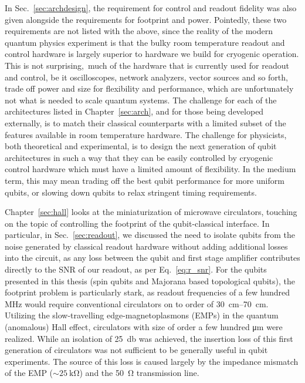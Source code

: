 In Sec.~\ref{sec:archdesign}, the requirement for control and readout fidelity was also given alongside the requirements for footprint and power. Pointedly,
these two requirements are not listed with the above, since the reality of the modern quantum physics experiment is that the bulky room temperature readout
and control hardware is largely superior to hardware we build for cryogenic operation. This is not surprising, much of the hardware that is currently used
for readout and control, be it oscilloscopes, network analyzers, vector sources and so forth, trade off power and size for flexibility and performance, which
are unfortunately not what is needed to scale quantum systems. The challenge for each of the architectures listed in Chapter~\ref{sec:arch}, and for those
being developed externally, is to match their classical counterparts with a limited subset of the features available in room temperature hardware.
The challenge for physicists, both theoretical and experimental, is to design the next generation of qubit architectures in such a way that they can be easily
controlled by cryogenic control hardware which must have a limited amount of flexibility. In the medium term, this may mean trading off the best qubit performance
for more uniform qubits, or slowing down qubits to relax stringent timing requirements.

Chapter~\ref{sec:hall} looks at the miniaturization of microwave circulators, touching on the topic of controlling the footprint of the qubit-classical
interface. In particular, in Sec.~\ref{sec:readout}, we discussed the need to isolate qubits from the noise generated by classical readout hardware without
adding additional losses into the circuit, as any loss between the qubit and first stage amplifier contributes directly to the SNR of our readout, as per
Eq.~\ref{eq:r_snr}. For the qubits presented in this thesis (spin qubits and Majorana based topological qubits), the footprint problem is particularly
stark, as readout frequencies of a few hundred \si{\mega\hertz} would require conventional circulators on to order of \SIrange{30}{70}{\centi\meter}.
Utilizing the slow-travelling edge-magnetoplasmons (EMPs) in the quantum (anomalous) Hall effect, circulators with size of order a few hundred \si{\micro\meter}
were realized. While an isolation of \SI{25}{\decibel} was achieved, the insertion loss of this first generation of circulators was not sufficient to
be generally useful in qubit experiments. The source of this loss is caused largely by the impedance mismatch of the EMP ($\sim \SI{25}{\kilo\ohm}$) and the
\SI{50}{\ohm} transmission line.

